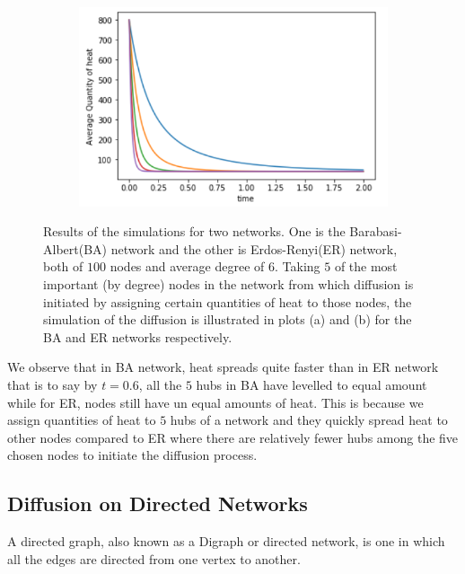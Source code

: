 \documentclass[10pt,a4paper]{article}
\begin{document}
\begin{figure}[H]
\begin{subfigure}[b]{0.45\textwidth}
     		\caption{}
     		\label{}
     	\end{subfigure}~
     	\begin{subfigure}[b]{0.45\textwidth}
     		\includegraphics[width= \textwidth]{images/E-R-random.png}
     		\caption{}
     		\label{}
     	\end{subfigure}
     	\caption{ Results of the simulations for two networks. One is the Barabasi-Albert(BA) network and  the other is Erdos-Renyi(ER) network, both of $100$ nodes and average degree of $6$. Taking $5$ of the most important (by degree) nodes in the network from which diffusion is initiated by assigning certain quantities of heat to those nodes, the simulation of the diffusion is illustrated in plots (a) and (b) for the BA and ER networks respectively.}
     	\label{key}
     \end{figure}
     
     We observe that in BA network, heat spreads quite faster than in ER network that is to say by $t=0.6$, all the $5$ hubs in BA have levelled to equal amount while for ER, nodes still have un equal amounts of heat. This is because we assign quantities of heat to $5$ hubs of a network and they quickly spread heat to other nodes compared to ER where there are relatively fewer hubs among the five chosen nodes to initiate the diffusion process.
     
     \newpage
     
        \subsection{Diffusion on Directed Networks}
        A directed graph, also known as a Digraph or directed network, is one in which all the edges are directed from one vertex to another. 
        
\end{document}
